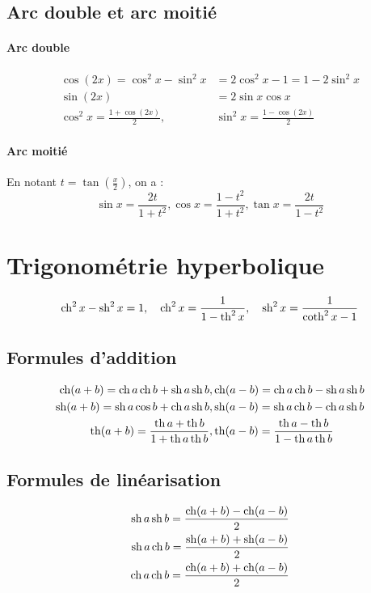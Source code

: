 \subsection{Arc double et arc moitié}
\paragraph{Arc double}
\begin{align}
  \cos(2x)=\cos^2 x - \sin^2 x &= 2\cos^2 x -1 = 1-2\sin^2 x \\
  \sin(2x)&=2\sin x \cos x \\
  \cos^2 x = \frac{1+\cos(2x)}{2}, & \sin^2 x = \frac{1-\cos(2x)}{2}
\end{align}
\paragraph{Arc moitié}
En notant \(t = \tan \left(\frac{x}{2}\right)\), on a :
\begin{equation}
  \sin x = \frac{2t}{1+t^2}, \cos x = \frac{1-t^2}{1+t^2}, \tan x = \frac{2t}{1-t^2}
\end{equation}
\section{Trigonométrie hyperbolique}
\begin{equation}
  \operatorname{ch}^2x-\operatorname{sh}^2x = 1, \quad \operatorname{ch}^2x=\frac{1}{1-\operatorname{th}^2x}, \quad \operatorname{sh}^2x=\frac{1}{\operatorname{coth}^2x-1}
\end{equation}
\subsection{Formules d'addition}
\begin{align}
  \operatorname{ch}(a+b)=\operatorname{ch} a \operatorname{ch} b +\operatorname{sh} a \operatorname{sh} b, &   \operatorname{ch}(a-b)=\operatorname{ch} a \operatorname{ch} b -\operatorname{sh} a \operatorname{sh} b \\
  \operatorname{sh}(a+b)=\operatorname{sh} a \cos b +\operatorname{ch} a \operatorname{sh} b, &   \operatorname{sh}(a-b)=\operatorname{sh} a \operatorname{ch} b -\operatorname{ch} a \operatorname{sh} b \\
  \operatorname{th}(a+b)=\frac{\operatorname{th} a+ \operatorname{th} b}{1+\operatorname{th} a \operatorname{th} b}, &   \operatorname{th}(a-b)=\frac{\operatorname{th} a - \operatorname{th} b}{1-\operatorname{th} a \operatorname{th} b}
\end{align}
\subsection{Formules de linéarisation}
\begin{align}
  \operatorname{sh} a \operatorname{sh} b = \frac{\operatorname{ch}(a+b)-\operatorname{ch}(a-b)}{2} \\
  \operatorname{sh} a \operatorname{ch} b = \frac{\operatorname{sh}(a+b)+\operatorname{sh}(a-b)}{2} \\
  \operatorname{ch} a \operatorname{ch} b = \frac{\operatorname{ch}(a+b)+\operatorname{ch}(a-b)}{2} 
\end{align}
